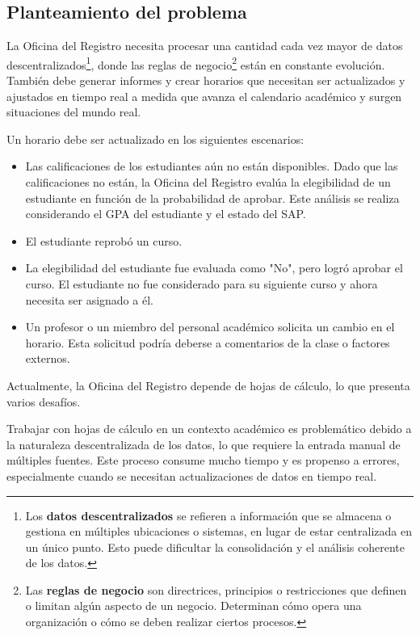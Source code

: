 \subsection{Planteamiento del problema}
La Oficina del Registro necesita procesar una cantidad cada vez mayor de datos descentralizados\footnote{Los \textbf{datos descentralizados} se refieren a información que se almacena o gestiona en múltiples ubicaciones o sistemas, en lugar de estar centralizada en un único punto.
Esto puede dificultar la consolidación y el análisis coherente de los datos.}, donde las reglas de negocio\footnote{Las \textbf{reglas de negocio} son directrices, principios o restricciones que definen o limitan algún aspecto de un negocio.
Determinan cómo opera una organización o cómo se deben realizar ciertos procesos.} están en constante evolución.
También debe generar informes y crear horarios que necesitan ser actualizados y ajustados en tiempo real a medida que avanza el calendario académico y surgen situaciones del mundo real.

Un horario debe ser actualizado en los siguientes escenarios:
\begin{itemize}
    \item Las calificaciones de los estudiantes aún no están disponibles.
Dado que las calificaciones no están, la Oficina del Registro evalúa la elegibilidad de un estudiante en función de la probabilidad de aprobar.
Este análisis se realiza considerando el GPA del estudiante y el estado del SAP.
    \item El estudiante reprobó un curso.
    \item La elegibilidad del estudiante fue evaluada como "No", pero logró aprobar el curso.
El estudiante no fue considerado para su siguiente curso y ahora necesita ser asignado a él.
    \item Un profesor o un miembro del personal académico solicita un cambio en el horario.
Esta solicitud podría deberse a comentarios de la clase o factores externos.
\end{itemize}

Actualmente, la Oficina del Registro depende de hojas de cálculo, lo que presenta varios desafíos.

Trabajar con hojas de cálculo en un contexto académico es problemático debido a la naturaleza descentralizada de los datos, lo que requiere la entrada manual de múltiples fuentes.
Este proceso consume mucho tiempo y es propenso a errores, especialmente cuando se necesitan actualizaciones de datos en tiempo real.

